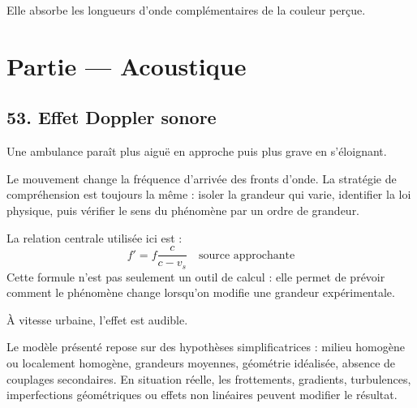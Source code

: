 \documentclass[11pt,a4paper]{article}
\begin{document}
\begin{corrigebox}[Indication]
Elle absorbe les longueurs d'onde complémentaires de la couleur perçue.
\end{corrigebox}


\section{Partie — Acoustique}


\subsection{53. Effet Doppler sonore}

\begin{exemplebox}
Une ambulance paraît plus aiguë en approche puis plus grave en s'éloignant.
\end{exemplebox}

\begin{methodebox}
Le mouvement change la fréquence d'arrivée des fronts d'onde.
La stratégie de compréhension est toujours la même : isoler la grandeur qui varie, identifier la loi physique, puis vérifier le sens du phénomène par un ordre de grandeur.
\end{methodebox}

\begin{theorembox}
La relation centrale utilisée ici est :
\[
f'=f\frac{c}{c-v_s}\quad\text{source approchante}
\]
Cette formule n'est pas seulement un outil de calcul : elle permet de prévoir comment le phénomène change lorsqu'on modifie une grandeur expérimentale.
\end{theorembox}

\begin{odgbox}
À vitesse urbaine, l'effet est audible.
\end{odgbox}

\begin{attentionbox}
Le modèle présenté repose sur des hypothèses simplificatrices : milieu homogène ou localement homogène, grandeurs moyennes, géométrie idéalisée, absence de couplages secondaires. En situation réelle, les frottements, gradients, turbulences, imperfections géométriques ou effets non linéaires peuvent modifier le résultat.
\end{attentionbox}
\end{document}
